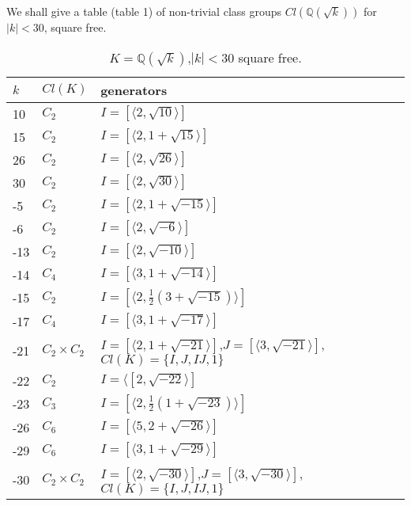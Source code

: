We shall give a table (table 1) of non-trivial class groups $Cl(\mathbb{Q}(\sqrt{k}))$ for $|k|<30$, square free.


\begin{table}[htbp]
\begin{center}
 \caption{$K=\mathbb{Q}(\sqrt{k})$,$|k|<30$ square free.}
 \begin{tabular}{lll}
  \hline
  $k$ & $Cl(K)$&generators\\
  \hline
  10 & $C_2$&$I=[\langle 2,\sqrt{10}\rangle]$\\
  15 & $C_2$&$I=[\langle 2,1+\sqrt{15}\rangle]$\\
  26 & $C_2$&$I=[\langle 2,\sqrt{26}\rangle]$\\
  30 & $C_2$&$I=[\langle 2,\sqrt{30}\rangle]$\\
  -5 & $C_2$&$I=[\langle 2,1+\sqrt{-15}\rangle]$\\
  -6 & $C_2$&$I=[\langle 2,\sqrt{-6}\rangle]$\\
  -13 & $C_2$&$I=[\langle 2,\sqrt{-10}\rangle]$\\
  -14& $C_4$&$I=[\langle 3,1+\sqrt{-14}\rangle]$\\
  -15 & $C_2$&$I=[\langle 2,\frac{1}{2}(3+\sqrt{-15})\rangle]$\\
  -17 & $C_4$&$I=[\langle 3,1+\sqrt{-17}\rangle]$\\
  -21 & $C_2 \times C_2$&$I=[\langle 2,1+\sqrt{-21}\rangle]$,$J=[\langle 3,\sqrt{-21}\rangle]$, $Cl(K)=\{I,J,IJ,1\}$\\
  -22 & $C_2$&$I=\langle [2,\sqrt{-22}\rangle]$\\
  -23 & $C_3$&$I=[\langle 2,\frac{1}{2}(1+\sqrt{-23})\rangle]$\\
  -26 & $C_6$&$I=[\langle 5,2+\sqrt{-26}\rangle]$\\
  -29 & $C_6$&$I=[\langle 3,1+\sqrt{-29}\rangle]$\\
  -30 & $C_2\times C_2$&$I=[\langle 2,\sqrt{-30}\rangle]$,$J=[\langle 3,\sqrt{-30}\rangle]$,
$Cl(K)=\{I,J,IJ,1\}$\\
  \hline
 \end{tabular}
\end{center}
\end{table}


